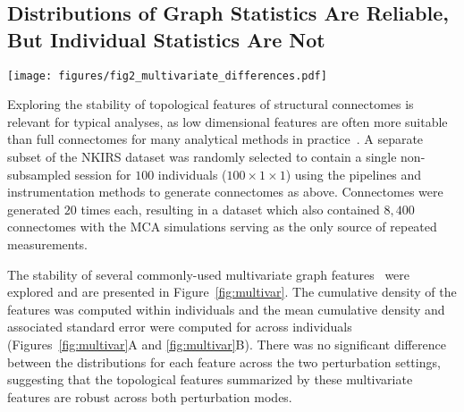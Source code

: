 \documentclass[fleqn,10pt]{SelfArx} %
\newcommand{\new}[1]{{#1}}
\newcommand{\newtwo}[1]{{#1}}
\begin{document}
\subsection*{Distributions of Graph Statistics Are Reliable, But Individual Statistics Are Not}
\begin{figure*}[bht!]\centering
\texttt{[image: figures/fig2\_multivariate\_differences.pdf]}
\caption{Distribution and stability assessment of multivariate graph statistics. (\textbf{A}, \textbf{B}) The
cumulative distribution functions of multivariate statistics across all subjects and perturbation settings. There was
no significant difference between the distributions in A and B. (\textbf{C}, \textbf{D}) The number of significant
digits in the first $5$ five moments of each statistic across perturbations. The dashed red line refers to the maximum
possible number of significant digits.}
\label{fig:multivar}
\end{figure*}

Exploring the stability of topological features of \newtwo{structural} connectomes is relevant for typical analyses, as low dimensional
features are often more suitable than full connectomes for many analytical methods in practice~\cite{Rubinov2010-fh}.
A separate subset of the NKIRS dataset was randomly selected to contain a single non-subsampled session for $100$
individuals \new{($100 \times 1 \times 1$) using the pipelines and instrumentation methods to generate connectomes as
above. Connectomes were generated $20$ times each, resulting in a dataset which also contained $8,400$ connectomes with
the MCA simulations serving as the only source of repeated measurements.}

The stability of several commonly-used multivariate graph features~\cite{Betzel2018-eo} \new{were} explored \new{and
are presented} in Figure~\ref{fig:multivar}. The cumulative density of the features was computed within individuals and
the mean \new{cumulative} density and associated standard error were computed for across individuals
(Figures~\ref{fig:multivar}A and \ref{fig:multivar}B). There was no significant difference between the distributions
for each feature across the two perturbation settings, suggesting that the topological features summarized by these
multivariate features are robust across both perturbation modes.
\end{document}
